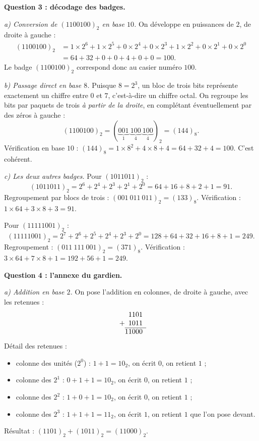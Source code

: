\documentclass[11pt]{article}
\begin{document}
\begin{exoresolu}
\textbf{Question 3 : décodage des badges.}

\emph{a) Conversion de $(1100100)_2$ en base $10$.} On développe en puissances de $2$, de droite à gauche :
\begin{align*}
(1100100)_2 &= 1 \times 2^6 + 1 \times 2^5 + 0 \times 2^4 + 0 \times 2^3 + 1 \times 2^2 + 0 \times 2^1 + 0 \times 2^0 \\
&= 64 + 32 + 0 + 0 + 4 + 0 + 0 = 100.
\end{align*}
Le badge $(1100100)_2$ correspond donc au casier numéro $100$.

\emph{b) Passage direct en base $8$.} Puisque $8 = 2^3$, un bloc de trois bits représente exactement un chiffre entre $0$ et $7$, c'est-à-dire un chiffre octal. On regroupe les bits par paquets de trois \emph{à partir de la droite}, en complétant éventuellement par des zéros à gauche :
\[ (1100100)_2 = (\underbrace{001}_{1}\ \underbrace{100}_{4}\ \underbrace{100}_{4})_2 = (144)_8. \]
Vérification en base $10$ : $(144)_8 = 1 \times 8^2 + 4 \times 8 + 4 = 64 + 32 + 4 = 100$. C'est cohérent.

\emph{c) Les deux autres badges.} Pour $(1011011)_2$ :
\[ (1011011)_2 = 2^6 + 2^4 + 2^3 + 2^1 + 2^0 = 64 + 16 + 8 + 2 + 1 = 91. \]
Regroupement par blocs de trois : $(001\ 011\ 011)_2 = (133)_8$. Vérification : $1 \times 64 + 3 \times 8 + 3 = 91$.

Pour $(11111001)_2$ :
\[ (11111001)_2 = 2^7 + 2^6 + 2^5 + 2^4 + 2^3 + 2^0 = 128 + 64 + 32 + 16 + 8 + 1 = 249. \]
Regroupement : $(011\ 111\ 001)_2 = (371)_8$. Vérification : $3 \times 64 + 7 \times 8 + 1 = 192 + 56 + 1 = 249$.

\textbf{Question 4 : l'annexe du gardien.}

\emph{a) Addition en base $2$.} On pose l'addition en colonnes, de droite à gauche, avec les retenues :
\[
\begin{array}{c@{}c@{}c@{}c@{}c@{}c}
& & 1 & 1 & 0 & 1 \\
+ & & 1 & 0 & 1 & 1 \\ \cline{2-6}
& 1 & 1 & 0 & 0 & 0
\end{array}
\]
Détail des retenues :
\begin{itemize}
\item colonne des unités ($2^0$) : $1 + 1 = 10_2$, on écrit $0$, on retient $1$ ;
\item colonne des $2^1$ : $0 + 1 + 1 = 10_2$, on écrit $0$, on retient $1$ ;
\item colonne des $2^2$ : $1 + 0 + 1 = 10_2$, on écrit $0$, on retient $1$ ;
\item colonne des $2^3$ : $1 + 1 + 1 = 11_2$, on écrit $1$, on retient $1$ que l'on pose devant.
\end{itemize}
Résultat : $(1101)_2 + (1011)_2 = (11000)_2$.


\end{exoresolu}
\end{document}
